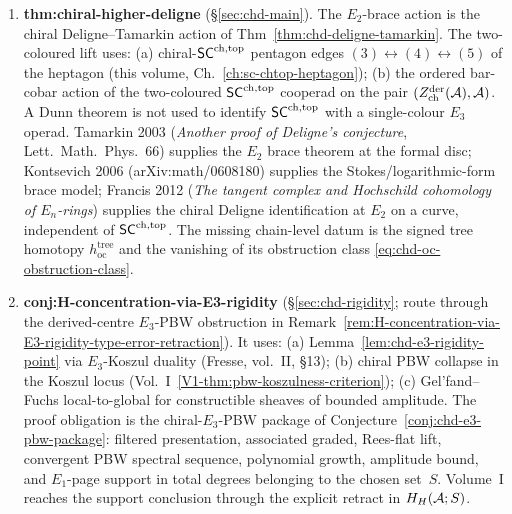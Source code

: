 \begin{enumerate}
\item \textbf{thm:chiral-higher-deligne} (\S\ref{sec:chd-main}).
The $E_2$-brace action is the chiral Deligne--Tamarkin action of
Thm~\ref{thm:chd-deligne-tamarkin}. The two-coloured lift uses:
(a) chiral-$\mathsf{SC}^{\mathrm{ch},\mathrm{top}}$ pentagon edges
$(3)\leftrightarrow(4)\leftrightarrow(5)$ of the heptagon
(this volume, Ch.~\ref{ch:sc-chtop-heptagon}); (b) the ordered
bar-cobar action of the two-coloured $\mathsf{SC}^{\mathrm{ch},\mathrm{top}}$ cooperad on the pair
$(Z^{\mathrm{der}}_{\mathrm{ch}}(\mathcal{A}),\mathcal{A})$. A Dunn theorem is not
used to identify $\mathsf{SC}^{\mathrm{ch},\mathrm{top}}$ with a single-colour $E_3$ operad.
Tamarkin 2003 (\emph{Another proof of Deligne's conjecture},
Lett.~Math.~Phys.\ 66) supplies the $E_2$ brace theorem at the formal
disc; Kontsevich 2006 (arXiv:math/0608180) supplies the
Stokes/logarithmic-form brace model; Francis 2012
(\emph{The tangent complex and Hochschild cohomology of $E_n$-rings})
supplies the chiral Deligne identification at $E_2$ on a curve,
independent of $\mathsf{SC}^{\mathrm{ch},\mathrm{top}}$. The missing chain-level datum is
the signed tree homotopy \(h_{\mathrm{oc}}^{\mathrm{tree}}\) and the
vanishing of its obstruction class
\eqref{eq:chd-oc-obstruction-class}.

\item \textbf{conj:H-concentration-via-E3-rigidity}
(\S\ref{sec:chd-rigidity}; route through the derived-centre
$E_3$-PBW obstruction in
Remark~\ref{rem:H-concentration-via-E3-rigidity-type-error-retraction}).
It uses: (a) Lemma~\ref{lem:chd-e3-rigidity-point} via
$E_3$-Koszul duality (Fresse, vol.~II, \S13); (b) chiral PBW
collapse in the Koszul locus
(Vol.~I~\ref*{V1-thm:pbw-koszulness-criterion}); (c) Gel'fand--Fuchs
local-to-global for constructible sheaves of bounded amplitude.
The proof obligation is the chiral-$E_3$-PBW package
of Conjecture~\ref{conj:chd-e3-pbw-package}: filtered presentation,
associated graded, Rees-flat lift, convergent PBW spectral sequence, polynomial
growth, amplitude bound, and \(E_1\)-page support in total degrees
belonging to the chosen set~$S$.  Volume~I reaches the support
conclusion through the explicit retract in $H_H(\mathcal{A};S)$.


\end{enumerate}
